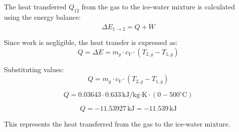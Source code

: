 The heat transferred \( Q_{12} \) from the gas to the ice-water mixture is calculated using the energy balance:  
\[
\Delta E_{1 \to 2} = \dot{Q} + \dot{W}
\]

Since work is negligible, the heat transfer is expressed as:  
\[
Q = \Delta E = m_g \cdot c_V \cdot (T_{2,g} - T_{1,g})
\]

Substituting values:  
\[
Q = m_g \cdot c_V \cdot (T_{2,g} - T_{1,g})
\]

\[
Q = 0.03643 \cdot 0.633 \, \text{kJ/kg·K} \cdot (0 - 500^\circ\text{C})
\]

\[
Q = -11.53927 \, \text{kJ} = -11.539 \, \text{kJ}
\]  

This represents the heat transferred from the gas to the ice-water mixture.
